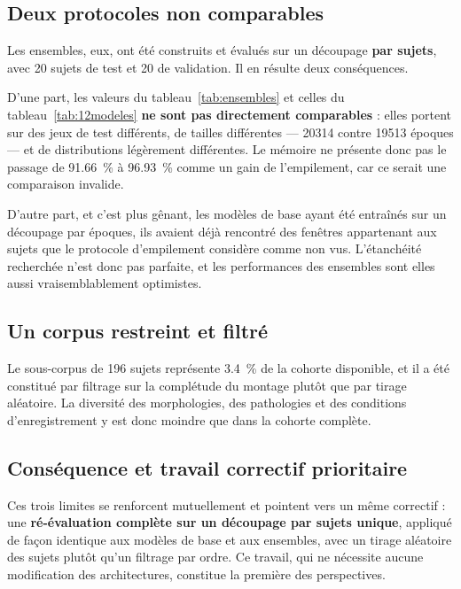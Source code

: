 \subsection{Deux protocoles non comparables}

Les ensembles, eux, ont été construits et évalués sur un découpage \textbf{par sujets},
avec \num{20} sujets de test et \num{20} de validation. Il en résulte deux
conséquences.

D'une part, les valeurs du tableau~\ref{tab:ensembles} et celles du
tableau~\ref{tab:12modeles} \textbf{ne sont pas directement comparables} : elles
portent sur des jeux de test différents, de tailles différentes — \num{20314} contre
\num{19513} époques — et de distributions légèrement différentes. Le mémoire ne
présente donc pas le passage de \SI{91,66}{\percent} à \SI{96,93}{\percent} comme un
gain de l'empilement, car ce serait une comparaison invalide.

D'autre part, et c'est plus gênant, les modèles de base ayant été entraînés sur un
découpage par époques, ils avaient déjà rencontré des fenêtres appartenant aux sujets
que le protocole d'empilement considère comme non vus. L'étanchéité recherchée n'est
donc pas parfaite, et les performances des ensembles sont elles aussi
vraisemblablement optimistes.

\subsection{Un corpus restreint et filtré}

Le sous-corpus de 196 sujets représente \SI{3,4}{\percent} de la cohorte disponible,
et il a été constitué par filtrage sur la complétude du montage plutôt que par tirage
aléatoire. La diversité des morphologies, des pathologies et des conditions
d'enregistrement y est donc moindre que dans la cohorte complète.

\subsection{Conséquence et travail correctif prioritaire}

Ces trois limites se renforcent mutuellement et pointent vers un même correctif : une
\textbf{ré-évaluation complète sur un découpage par sujets unique}, appliqué de façon
identique aux modèles de base et aux ensembles, avec un tirage aléatoire des sujets
plutôt qu'un filtrage par ordre. Ce travail, qui ne nécessite aucune modification des
architectures, constitue la première des perspectives.

